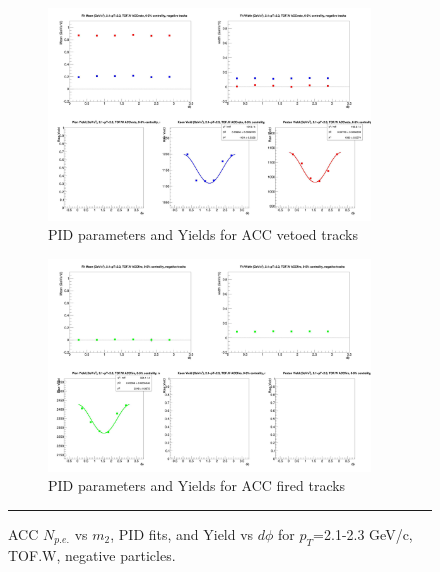\begin{figure}[H]
  \ContinuedFloat
    \vspace*{-1cm}
    \begin{subfigure}{1\textwidth}
   \centering
   \includegraphics[width=0.94\textwidth]{hiptfits/neg/fitParams_tof2_cent0_ch0_pT-21-23.jpg}
    \caption{PID parameters and Yields for ACC vetoed tracks}
    \end{subfigure}    
    \begin{subfigure}{1\textwidth}
   \centering
   \includegraphics[width=0.94\textwidth]{hiptfits/neg/fitParams_tof3_cent0_ch0_pT-21-23.jpg}
    \caption{PID parameters and Yields for ACC fired tracks}
    \end{subfigure} 
    \rule{35em}{0.5pt}
  \caption[ACC $N_{p.e.}$ vs $m_2$, PID fits, and Yield vs $d\phi$ for $p_T$=2.1-2.3 GeV/c, TOF.W, negative particles.]{ACC $N_{p.e.}$ vs $m_2$, PID fits, and Yield vs $d\phi$ for $p_T$=2.1-2.3 GeV/c, TOF.W, negative particles.}
  \label{fig:acc21-23neg}
\end{figure}



